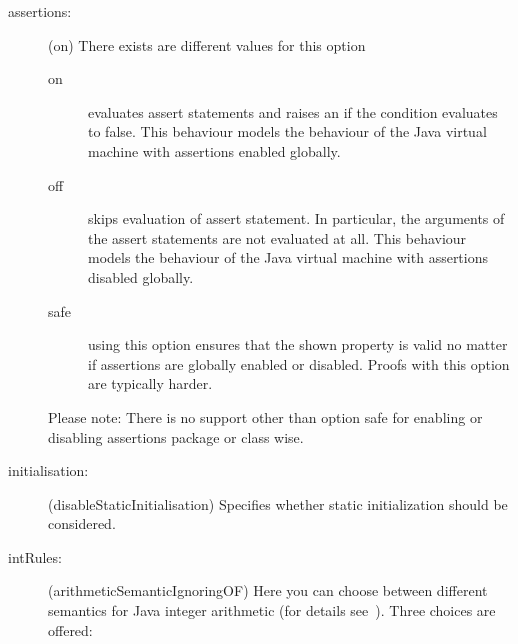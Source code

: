 \begin{description}
\begin{description}
\begin{description}
    \item[assertions:] (\textsf{on}) There exists are
      different values for this option
      \begin{description}
        \item[\textsf{on}] evaluates assert statements and raises an
           if the condition evaluates to
          false. This behaviour models the behaviour of the Java
          virtual machine with assertions enabled globally.
        \item[\textsf{off}] skips evaluation of assert statement. In
          particular, the arguments of the assert statements are not
          evaluated at all. This behaviour models the behaviour of the
          Java virtual machine with assertions disabled globally.
        \item[\textsf{safe}] using this option ensures that the shown property
          is valid no matter if assertions are globally enabled or
          disabled. Proofs with this option are typically harder. 
      \end{description}
      Please note: There is no support other than option \textsf{safe}
      for enabling or disabling assertions package or class wise.

     \item[initialisation:] (\textsf{disableStaticInitialisation})
    Specifies whether static initialization should be considered.

    \item[intRules:] 
      (\textsf{arithmeticSemanticIgnoringOF}) Here you can choose
      between different semantics for Java integer arithmetic (for
      details
      see~\cite{Schlager02,SchlagerPhD2007,KeYBook2007}). Three
      choices are offered:


\end{description}
\end{description}
\end{description}
